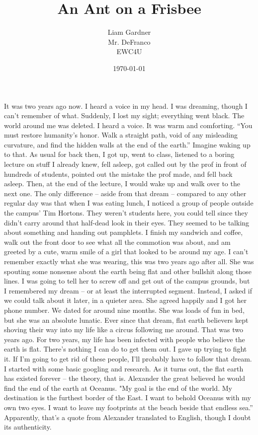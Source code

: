 \documentclass[a4paper, 12pt]{book}
\title{An Ant on a Frisbee}
\author{Liam Gardner\\Mr. DeFranco\\EWC4U}
\date{\today}
\newcommand\tab[1][1cm]{\hspace*{#1}}
\begin{document}
\maketitle
\tab
It was two years ago now. I heard a voice in my head. I was dreaming, though I can’t remember of what. Suddenly, I lost my sight; everything went black. The world around me was deleted. I heard a voice. It was warm and comforting. “You must restore humanity’s honor. Walk a straight path, void of any misleading curvature, and find the hidden walls at the end of the earth.” Imagine waking up to that.
\newline
\tab
As usual for back then, I got up, went to class, listened to a boring lecture on stuff I already knew, fell asleep, got called out by the prof in front of hundreds of students, pointed out the mistake the prof made, and fell back asleep. Then, at the end of the lecture, I would wake up and walk over to the next one. The only difference -- aside from that dream -- compared to any other regular day was that when I was eating lunch, I noticed a group of people outside the campus’ Tim Hortons. They weren’t students here, you could tell since they didn’t carry around that half-dead look in their eyes. They seemed to be talking about something and handing out pamphlets. I finish my sandwich and coffee, walk out the front door to see what all the commotion was about, and am greeted by a cute, warm smile of a girl that looked to be around my age. I can’t remember exactly what she was wearing, this was two years ago after all. She was spouting some nonsense about the earth being flat and other bullshit along those lines. I was going to tell her to screw off and get out of the campus grounds, but I remembered my dream – or at least the interrupted segment. Instead, I asked if we could talk about it later, in a quieter area. She agreed happily and I got her phone number.
\newline
\tab
We dated for around nine months. She was loads of fun in bed, but she was an absolute lunatic. Ever since that dream, flat earth believers kept shoving their way into my life like a circus following me around. That was two years ago. For two years, my life has been infected with people who believe the earth is flat. There’s nothing I can do to get them out.  
\newline
\tab
I gave up trying to fight it. If I’m going to get rid of these people, I’ll probably have to follow that dream. I started with some basic googling and research. As it turns out, the flat earth has existed forever – the theory, that is. Alexander the great believed he would find the end of the earth at Oceanus. "My goal is the end of the world. My destination is the furthest border of the East. I want to behold Oceanus with my own two eyes. I want to leave my footprints at the beach beside that endless sea.” Apparently, that’s a quote from Alexander translated to English, though I doubt its authenticity. 
\end{document}

